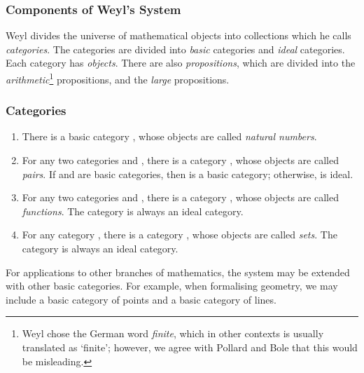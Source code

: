 \documentclass[acmtocl]{acmtrans2m}
\begin{document}
\subsubsection{Components of Weyl's System}

Weyl divides the universe of mathematical objects into collections which he calls \emph{categories}.  The categories are divided into \emph{basic} categories and \emph{ideal} categories.  Each category has \emph{objects}.
There are also \emph{propositions}, which are divided into the
\emph{arithmetic}\footnote{Weyl chose the German word \emph{finite}, which in other contexts is usually translated as `finite'; however, we agree with Pollard and Bole \cite{weyl:continuum} that this would be misleading.} propositions, and the \emph{large} propositions.

\subsubsection{Categories}
\begin{enumerate}
\item There is a basic category , whose objects are called \emph{natural numbers}.
\item For any two categories  and , there is a category , whose objects are called \emph{pairs}.  If  and  are basic categories, then  is a basic category; otherwise,  is ideal.
\item For any two categories  and , there is a category , whose objects are called \emph{functions}.  The category  is always an ideal category.
\item For any category , there is a category , whose objects are called \emph{sets}.  The category  is always an ideal category.
\end{enumerate}
For applications to other branches of mathematics, the system may be extended with other basic categories.  For example, when formalising geometry, we may include a basic category of points and a basic category of lines.
\end{document}
